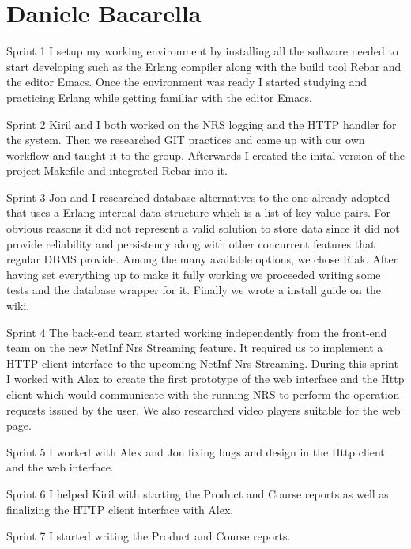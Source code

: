 \section{Daniele Bacarella}

Sprint 1
I setup my working environment by installing all the software needed to start developing such as the Erlang compiler along with the build tool Rebar and the editor Emacs.
Once the environment was ready I started studying and practicing Erlang while getting familiar with the editor Emacs.

Sprint 2
Kiril and I both worked on the NRS logging and the HTTP handler for the system. Then we researched GIT practices and came up with our own workflow and taught it to the group.
Afterwards I created the inital version of the project Makefile and integrated Rebar into it.

Sprint 3
Jon and I  researched database alternatives to the one already adopted that uses a Erlang internal data structure which is a list of key-value pairs. For obvious reasons it did not represent a valid solution to store data since it did not provide reliability and persistency along with other concurrent features that regular DBMS  provide.
Among the many available options, we chose Riak.
After having set everything up to make it fully working we proceeded writing some tests and the database wrapper for it.
Finally we wrote a install guide on the wiki. 

Sprint 4
The back-end team started working independently from the front-end team on the new NetInf Nrs Streaming feature.
It required us to implement a HTTP client interface to the upcoming NetInf Nrs Streaming.
During this sprint I worked with Alex to create the first prototype of the web interface and the Http client which would communicate with the running NRS to perform the operation requests issued by the user.
We also researched video players suitable for the web page.

Sprint 5
I worked with Alex and Jon fixing bugs and design in the Http client and the web interface.

Sprint 6
I helped Kiril with starting the Product and Course reports as well as finalizing the HTTP client interface with Alex.

Sprint 7
I started writing the Product and Course reports.